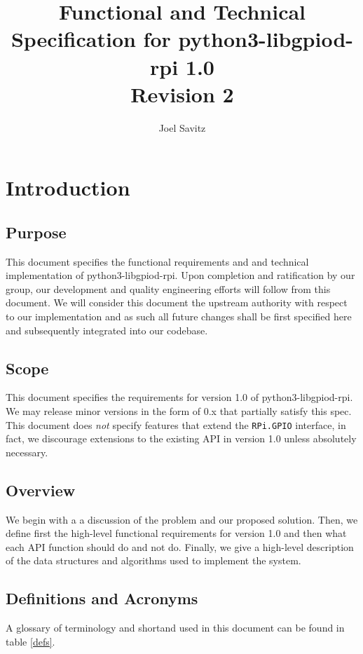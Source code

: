 \documentclass[12pt]{article}
\title{
{Functional and Technical Specification for python3-libgpiod-rpi 1.0} \\
{Revision 2}
}
\author{Joel Savitz}
\begin{document}
\maketitle

\section{Introduction}
\subsection{Purpose}
This document specifies the functional requirements and and technical implementation of python3-libgpiod-rpi. Upon completion and ratification by our group, our development and quality engineering efforts will follow from this document. We will consider this document the upstream authority with respect to our implementation and as such all future changes shall be first specified here and subsequently integrated into our codebase.


\subsection{Scope}
This document specifies the requirements for version 1.0 of python3-libgpiod-rpi. We may release minor versions in the form of 0.x that partially satisfy this spec. This document does \textit{not} specify features that extend the \texttt{RPi.GPIO} interface, in fact, we discourage extensions to the existing API in version 1.0 unless absolutely necessary.


\subsection{Overview}
We begin with a a discussion of the problem and our proposed solution. Then, we define first the high-level functional requirements for version 1.0 and then what each API function should do and not do. Finally, we give a high-level description of the data structures and algorithms used to implement the system.


\subsection{Definitions and Acronyms}

A glossary of terminology and shortand used in this document can be found in table \ref{defs}.
\end{document}
